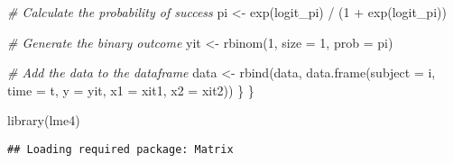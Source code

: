\documentclass[
]{article}
\newenvironment{Shaded}{\begin{snugshade}}{\end{snugshade}}
\newcommand{\AttributeTok}[1]{\textcolor[rgb]{0.77,0.63,0.00}{#1}}
\newcommand{\CommentTok}[1]{\textcolor[rgb]{0.56,0.35,0.01}{\textit{#1}}}
\newcommand{\DecValTok}[1]{\textcolor[rgb]{0.00,0.00,0.81}{#1}}
\newcommand{\FunctionTok}[1]{\textcolor[rgb]{0.00,0.00,0.00}{#1}}
\newcommand{\NormalTok}[1]{#1}
\newcommand{\OtherTok}[1]{\textcolor[rgb]{0.56,0.35,0.01}{#1}}
\newcommand{\SpecialCharTok}[1]{\textcolor[rgb]{0.00,0.00,0.00}{#1}}
\begin{document}
\begin{Shaded}
\begin{Highlighting}[]
    \CommentTok{\# Calculate the probability of success}
\NormalTok{    pi }\OtherTok{\textless{}{-}} \FunctionTok{exp}\NormalTok{(logit\_pi) }\SpecialCharTok{/}\NormalTok{ (}\DecValTok{1} \SpecialCharTok{+} \FunctionTok{exp}\NormalTok{(logit\_pi))}
    
    \CommentTok{\# Generate the binary outcome}
\NormalTok{    yit }\OtherTok{\textless{}{-}} \FunctionTok{rbinom}\NormalTok{(}\DecValTok{1}\NormalTok{, }\AttributeTok{size =} \DecValTok{1}\NormalTok{, }\AttributeTok{prob =}\NormalTok{ pi)}
    
    \CommentTok{\# Add the data to the dataframe}
\NormalTok{    data }\OtherTok{\textless{}{-}} \FunctionTok{rbind}\NormalTok{(data, }\FunctionTok{data.frame}\NormalTok{(}\AttributeTok{subject =}\NormalTok{ i, }\AttributeTok{time =}\NormalTok{ t, }\AttributeTok{y =}\NormalTok{ yit, }\AttributeTok{x1 =}\NormalTok{ xit1, }\AttributeTok{x2 =}\NormalTok{ xit2))}
\NormalTok{  \}}
\NormalTok{\}}
\end{Highlighting}
\end{Shaded}

\begin{Shaded}
\begin{Highlighting}[]
\FunctionTok{library}\NormalTok{(lme4)}
\end{Highlighting}
\end{Shaded}

\begin{verbatim}
## Loading required package: Matrix
\end{verbatim}
\end{document}
